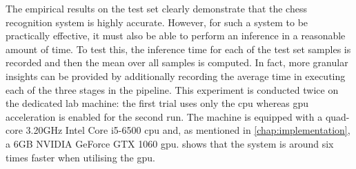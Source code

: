 \documentclass[../report.tex]{subfiles}
\begin{document}
The empirical results on the test set clearly demonstrate that the chess recognition system is highly accurate.
However, for such a system to be practically effective, it must also be able to perform an inference in a reasonable amount of time.
To test this, the inference time for each of the test set samples is recorded and then the mean over all samples is computed.
In fact, more granular insights can be provided by additionally recording the average time in executing each of the three stages in the pipeline.
This experiment is conducted twice on the dedicated lab machine: the first trial uses only the \gls{cpu} whereas \gls{gpu} acceleration is enabled for the second run.
The machine is equipped with a quad-core 3.20GHz Intel Core i5-6500 \gls{cpu} and, as mentioned in \cref{chap:implementation}, a 6GB NVIDIA GeForce GTX 1060 \gls{gpu}.
 shows that the system is around six times faster when utilising the \gls{gpu}.
\end{document}
